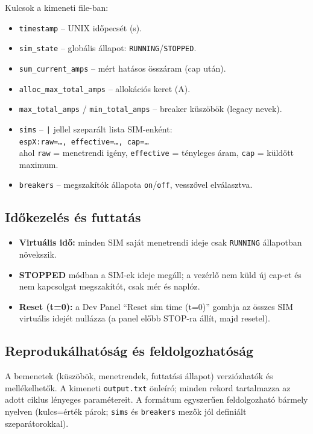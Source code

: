 \noindent Kulcsok a kimeneti file-ban:
\begin{itemize}
  \item \texttt{timestamp} -- UNIX időpecsét (s).
  \item \texttt{sim\_state} -- globális állapot: \texttt{RUNNING}/\texttt{STOPPED}.
  \item \texttt{sum\_current\_amps} -- mért hatásos összáram (cap után).
  \item \texttt{alloc\_max\_total\_amps} -- allokációs keret (A).
  \item \texttt{max\_total\_amps} / \texttt{min\_total\_amps} -- breaker küszöbök (legacy nevek).
  \item \texttt{sims} -- \texttt{|} jellel szeparált lista SIM-enként:\\
  \texttt{espX:raw=\dots, effective=\dots, cap=\dots}\\
  ahol \texttt{raw} = menetrendi igény, \texttt{effective} = tényleges áram, \texttt{cap} = küldött maximum.
  \item \texttt{breakers} -- megszakítók állapota \texttt{on}/\texttt{off}, vesszővel elválasztva.
\end{itemize}

\subsection{Időkezelés és futtatás}
\begin{itemize}
  \item \textbf{Virtuális idő:} minden SIM saját menetrendi ideje csak \texttt{RUNNING} állapotban növekszik.
  \item \textbf{STOPPED} módban a SIM-ek ideje megáll; a vezérlő nem küld új cap-et és 
  nem kapcsolgat megszakítót, csak mér és naplóz.
  \item \textbf{Reset (t=0):} a Dev Panel ``Reset sim time (t=0)'' gombja az összes 
  SIM virtuális idejét nullázza (a panel előbb STOP-ra állít, majd resetel).
\end{itemize}

\subsection{Reprodukálhatóság és feldolgozhatóság}
A bemenetek (küszöbök, menetrendek, futtatási állapot) verziózhatók és mellékelhetők. 
A kimeneti \texttt{output.txt} önleíró; minden rekord tartalmazza az adott ciklus lényeges paramétereit. 
A formátum egyszerűen feldolgozható bármely nyelven (kulcs=érték párok; \texttt{sims} és \texttt{breakers} 
mezők jól definiált szeparátorokkal).

